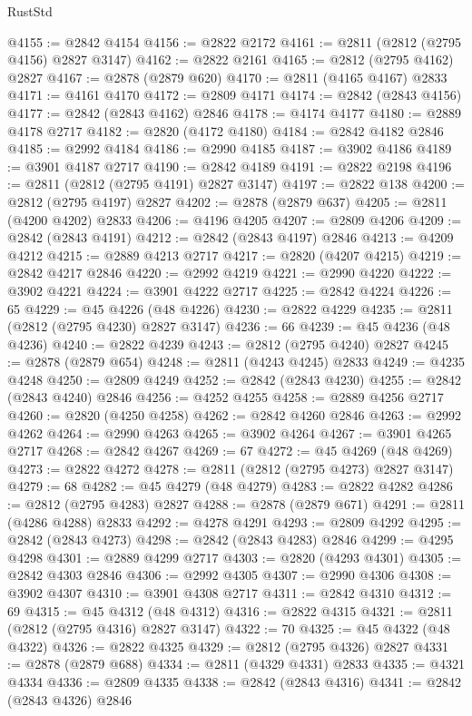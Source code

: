 \begin{lexlean}{RustStd}
\begin{coremodule}
@4155 := @2842 @4154
@4156 := @2822 @2172
@4161 := @2811 (@2812 (@2795 @4156) @2827 @3147)
@4162 := @2822 @2161
@4165 := @2812 (@2795 @4162) @2827
@4167 := @2878 (@2879 @620)
@4170 := @2811 (@4165 @4167) @2833
@4171 := @4161 @4170
@4172 := @2809 @4171
@4174 := @2842 (@2843 @4156)
@4177 := @2842 (@2843 @4162) @2846
@4178 := @4174 @4177
@4180 := @2889 @4178 @2717
@4182 := @2820 (@4172 @4180)
@4184 := @2842 @4182 @2846
@4185 := @2992 @4184
@4186 := @2990 @4185
@4187 := @3902 @4186
@4189 := @3901 @4187 @2717
@4190 := @2842 @4189
@4191 := @2822 @2198
@4196 := @2811 (@2812 (@2795 @4191) @2827 @3147)
@4197 := @2822 @138
@4200 := @2812 (@2795 @4197) @2827
@4202 := @2878 (@2879 @637)
@4205 := @2811 (@4200 @4202) @2833
@4206 := @4196 @4205
@4207 := @2809 @4206
@4209 := @2842 (@2843 @4191)
@4212 := @2842 (@2843 @4197) @2846
@4213 := @4209 @4212
@4215 := @2889 @4213 @2717
@4217 := @2820 (@4207 @4215)
@4219 := @2842 @4217 @2846
@4220 := @2992 @4219
@4221 := @2990 @4220
@4222 := @3902 @4221
@4224 := @3901 @4222 @2717
@4225 := @2842 @4224
@4226 := 65
@4229 := @45 @4226 (@48 @4226)
@4230 := @2822 @4229
@4235 := @2811 (@2812 (@2795 @4230) @2827 @3147)
@4236 := 66
@4239 := @45 @4236 (@48 @4236)
@4240 := @2822 @4239
@4243 := @2812 (@2795 @4240) @2827
@4245 := @2878 (@2879 @654)
@4248 := @2811 (@4243 @4245) @2833
@4249 := @4235 @4248
@4250 := @2809 @4249
@4252 := @2842 (@2843 @4230)
@4255 := @2842 (@2843 @4240) @2846
@4256 := @4252 @4255
@4258 := @2889 @4256 @2717
@4260 := @2820 (@4250 @4258)
@4262 := @2842 @4260 @2846
@4263 := @2992 @4262
@4264 := @2990 @4263
@4265 := @3902 @4264
@4267 := @3901 @4265 @2717
@4268 := @2842 @4267
@4269 := 67
@4272 := @45 @4269 (@48 @4269)
@4273 := @2822 @4272
@4278 := @2811 (@2812 (@2795 @4273) @2827 @3147)
@4279 := 68
@4282 := @45 @4279 (@48 @4279)
@4283 := @2822 @4282
@4286 := @2812 (@2795 @4283) @2827
@4288 := @2878 (@2879 @671)
@4291 := @2811 (@4286 @4288) @2833
@4292 := @4278 @4291
@4293 := @2809 @4292
@4295 := @2842 (@2843 @4273)
@4298 := @2842 (@2843 @4283) @2846
@4299 := @4295 @4298
@4301 := @2889 @4299 @2717
@4303 := @2820 (@4293 @4301)
@4305 := @2842 @4303 @2846
@4306 := @2992 @4305
@4307 := @2990 @4306
@4308 := @3902 @4307
@4310 := @3901 @4308 @2717
@4311 := @2842 @4310
@4312 := 69
@4315 := @45 @4312 (@48 @4312)
@4316 := @2822 @4315
@4321 := @2811 (@2812 (@2795 @4316) @2827 @3147)
@4322 := 70
@4325 := @45 @4322 (@48 @4322)
@4326 := @2822 @4325
@4329 := @2812 (@2795 @4326) @2827
@4331 := @2878 (@2879 @688)
@4334 := @2811 (@4329 @4331) @2833
@4335 := @4321 @4334
@4336 := @2809 @4335
@4338 := @2842 (@2843 @4316)
@4341 := @2842 (@2843 @4326) @2846

\end{coremodule}
\end{lexlean}
